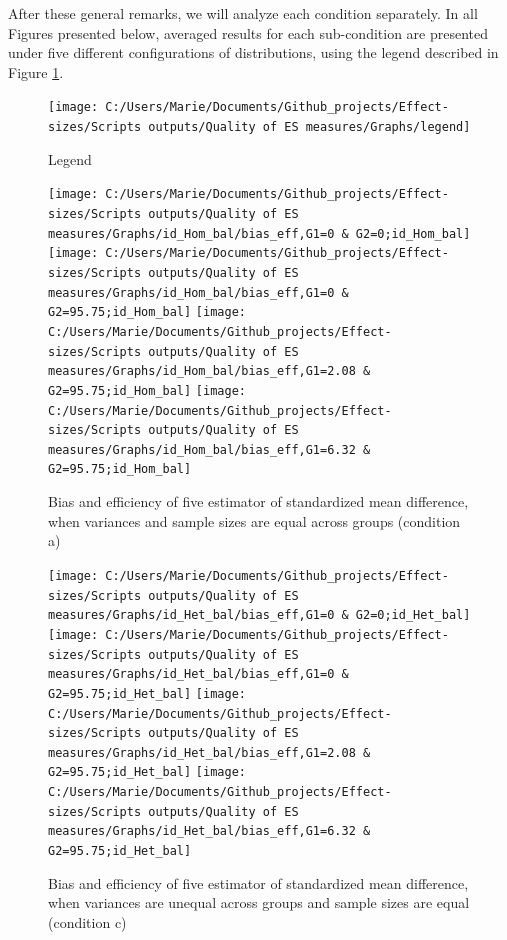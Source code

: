 \documentclass[
  man,floatsintext]{apa6}
\begin{document}
After these general remarks, we will analyze each condition separately. In all Figures presented below, averaged results for each sub-condition are presented under five different configurations of distributions, using the legend described in Figure \ref{fig:legend}.

\begin{figure}
\texttt{[image: C:/Users/Marie/Documents/Github\_projects/Effect-sizes/Scripts outputs/Quality of ES measures/Graphs/legend]} \caption{Legend}\label{fig:legend}
\end{figure}

\begin{figure}

{\centering \texttt{[image: C:/Users/Marie/Documents/Github\_projects/Effect-sizes/Scripts outputs/Quality of ES measures/Graphs/id\_Hom\_bal/bias\_eff,G1=0 \& G2=0;id\_Hom\_bal]} \texttt{[image: C:/Users/Marie/Documents/Github\_projects/Effect-sizes/Scripts outputs/Quality of ES measures/Graphs/id\_Hom\_bal/bias\_eff,G1=0 \& G2=95.75;id\_Hom\_bal]} \texttt{[image: C:/Users/Marie/Documents/Github\_projects/Effect-sizes/Scripts outputs/Quality of ES measures/Graphs/id\_Hom\_bal/bias\_eff,G1=2.08 \& G2=95.75;id\_Hom\_bal]} \texttt{[image: C:/Users/Marie/Documents/Github\_projects/Effect-sizes/Scripts outputs/Quality of ES measures/Graphs/id\_Hom\_bal/bias\_eff,G1=6.32 \& G2=95.75;id\_Hom\_bal]} 

}

\caption{Bias and efficiency of five estimator of standardized mean difference, when variances and sample sizes are equal across groups (condition a)}\label{fig:idHombal}
\end{figure}

\begin{figure}

{\centering \texttt{[image: C:/Users/Marie/Documents/Github\_projects/Effect-sizes/Scripts outputs/Quality of ES measures/Graphs/id\_Het\_bal/bias\_eff,G1=0 \& G2=0;id\_Het\_bal]} \texttt{[image: C:/Users/Marie/Documents/Github\_projects/Effect-sizes/Scripts outputs/Quality of ES measures/Graphs/id\_Het\_bal/bias\_eff,G1=0 \& G2=95.75;id\_Het\_bal]} \texttt{[image: C:/Users/Marie/Documents/Github\_projects/Effect-sizes/Scripts outputs/Quality of ES measures/Graphs/id\_Het\_bal/bias\_eff,G1=2.08 \& G2=95.75;id\_Het\_bal]} \texttt{[image: C:/Users/Marie/Documents/Github\_projects/Effect-sizes/Scripts outputs/Quality of ES measures/Graphs/id\_Het\_bal/bias\_eff,G1=6.32 \& G2=95.75;id\_Het\_bal]} 

}

\caption{Bias and efficiency of five estimator of standardized mean difference, when variances are unequal across groups and sample sizes are equal (condition c)}\label{fig:idHetbal}
\end{figure}
\end{document}
